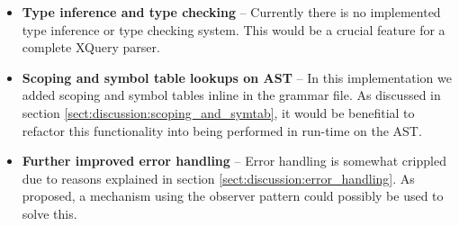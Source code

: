 \begin{itemize}
\item \textbf{Type inference and type checking} -- Currently there is no
implemented type inference or type checking system. This would be a crucial
feature for a complete XQuery parser.

\item \textbf{Scoping and symbol table lookups on AST} -- In this implementation
we added scoping and symbol tables inline in the grammar file. As discussed in
section \ref{sect:discussion:scoping_and_symtab}, it would be benefitial to
refactor this functionality into being performed in run-time on the AST.

\item \textbf{Further improved error handling} -- Error handling is somewhat
crippled due to reasons explained in section
\ref{sect:discussion:error_handling}. As proposed, a mechanism using the
observer pattern could possibly be used to solve this.

\end{itemize}





